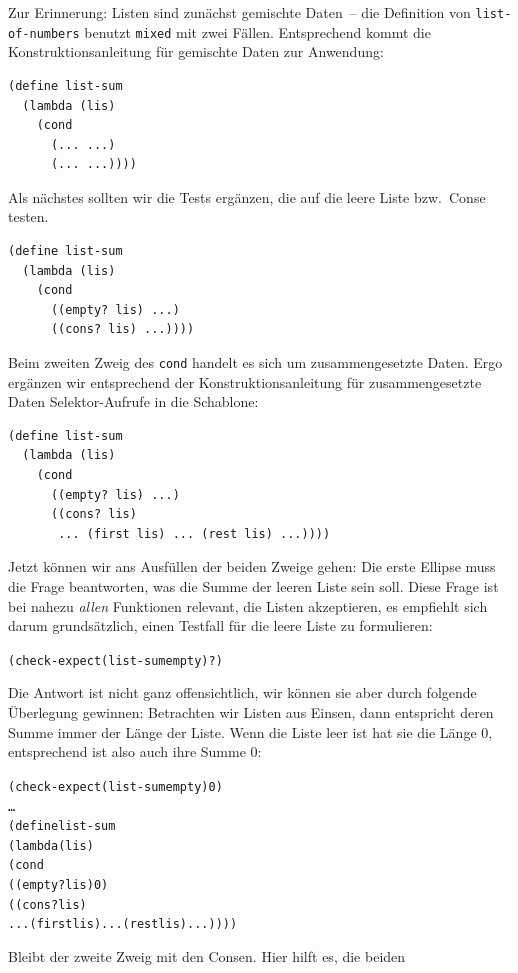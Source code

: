 Zur Erinnerung: Listen sind zunächst gemischte Daten~-- die Definition
von \texttt{list-of-numbers} benutzt \texttt{mixed} mit zwei Fällen.  Entsprechend kommt die
Konstruktionsanleitung für gemischte Daten zur Anwendung:
%
\begin{verbatim}
(define list-sum
  (lambda (lis)
    (cond
      (... ...)
      (... ...))))
\end{verbatim}
%
Als nächstes sollten wir die Tests ergänzen, die auf die leere
Liste bzw.\ Conse testen.  %
%
\begin{verbatim}
(define list-sum
  (lambda (lis)
    (cond
      ((empty? lis) ...)
      ((cons? lis) ...))))
\end{verbatim}
%
Beim zweiten Zweig des \texttt{cond} handelt es sich um
zusammengesetzte Daten. Ergo ergänzen wir entsprechend der
Konstruktionsanleitung für zusammengesetzte Daten Selektor-Aufrufe in
die Schablone:
%
\begin{verbatim}
(define list-sum
  (lambda (lis)
    (cond
      ((empty? lis) ...)
      ((cons? lis)
       ... (first lis) ... (rest lis) ...))))
\end{verbatim}
%
Jetzt können wir ans Ausfüllen der beiden Zweige gehen: Die erste
Ellipse muss die Frage beantworten, was die Summe der leeren Liste sein
soll.  Diese Frage ist bei nahezu \emph{allen} Funktionen relevant,
die Listen akzeptieren, es empfiehlt sich darum grundsätzlich, einen
Testfall für die leere Liste zu formulieren:
%
\begin{alltt}
(check-expect (list-sum empty) \textrm{?})
\end{alltt}
%
Die Antwort ist nicht ganz offensichtlich, wir können 
sie aber durch folgende Überlegung gewinnen: Betrachten wir Listen aus
Einsen, dann entspricht deren Summe immer der Länge der Liste.  Wenn
die Liste leer ist hat sie die Länge $0$, entsprechend ist also auch
ihre Summe $0$:
%
\begin{alltt}
(check-expect (list-sum empty) 0)
\ldots
(define list-sum
  (lambda (lis)
    (cond
      ((empty? lis) 0)
      ((cons? lis)
       ... (first lis) ... (rest lis) ...))))
\end{alltt}
%
Bleibt der zweite Zweig mit den Consen.  Hier hilft es, die beiden
